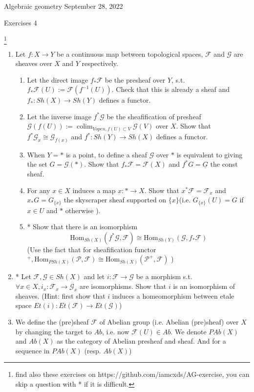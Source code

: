 \documentclass[a4paper,11pt]{article}
\def\Hom{\mathrm{Hom}}
\DeclareMathOperator{\colim}{colim}
\begin{document}
{\small Algebraic geometry \hfill September 28, 2022 \\}
\begin{center}
\Huge Exercises 4
\end{center}

\vskip0.6cm
\footnote{find also these exercises on https://github.com/iamcxds/AG-exercise, you can skip a question with * if it is difficult.}

\begin{enumerate}[1.]
\item Let $f: X\to Y$ be a continuous map between topological spaces, $\mathcal{F}$ and $\mathcal{G}$ are sheaves over $X$ and $Y$ respectively.
\begin{enumerate}
    \item Let the direct image $f_* \mathcal{F}$ be the presheaf over $Y$, s.t. $f_* \mathcal{F}(U):=\mathcal{F}(f^{-1}(U))$. Check that this is already a sheaf and $f_*: Sh(X)\to Sh(Y)$ defines a functor.
    \item Let the inverse image $f^*\mathcal{G}$ be the sheafification of presheaf $\mathcal{G}(f(U)):=\colim_{V open, f(U)\subset V}\mathcal{G}(V)$ over $X$. Show that $f^*\mathcal{G}_x\cong \mathcal{G}_{f(x)} $ and $f^*: Sh(Y)\to Sh(X)$ defines a functor.
    \item When $Y=*$ is a point, to define a sheaf $\mathcal{G}$ over $*$ is equivalent to giving the set $G=\mathcal{G}(*)$. Show that $f_* \mathcal{F}=\mathcal{F}(X)$ and $f^*G=\underline{G} $ the const sheaf.
    \item For any $x\in X$ induces a map $x: *\to X$. Show that $x^* \mathcal{F}=\mathcal{F}_x$ and $x_*G= G_{\{x\}} $ the skyscraper sheaf supported on $\{x\}$(i.e. $G_{\{x\}}(U)=G$ if $x\in U$ and $*$ otherwise ).
    \item* Show that there is an isomorphism 
    \[ \Hom_{Sh(X)}(f^*\mathcal{G},\mathcal{F})\cong \Hom_{Sh(Y)}(\mathcal{G},f_*\mathcal{F})\]
    (Use the fact that for sheafification functor $^+, \Hom_{PSh(X)}(\mathcal{P},\mathcal{F})\cong \Hom_{Sh(X)}(\mathcal{P}^+,\mathcal{F})$ )
\end{enumerate}
\item* Let $\mathcal{F},\mathcal{G}\in Sh(X)$ and let $i:\mathcal{F}\to\mathcal{G} $ be a morphism s.t. $ \forall x\in X, i_x:\mathcal{F}_x\to\mathcal{G}_x$ are isomorphisms. Show that $i$ is an isomorphism of sheaves. (Hint: first show that $i$ induces a homeomorphism between etale space $Et(i):Et(\mathcal{F})\to Et(\mathcal{G})$)
\item We define the (pre)sheaf $\mathcal{F}$ of Abelian group (i.e. Abelian (pre)sheaf) over $X$ by changing the target to $Ab$, i.e. now $\mathcal{F}(U)\in Ab$. We denote $PAb(X)$ and $Ab(X)$ as the category of Abelian presheaf and sheaf. And for a sequence in $PAb(X)$ (resp. $Ab(X)$) 

\end{enumerate}
\end{document}
